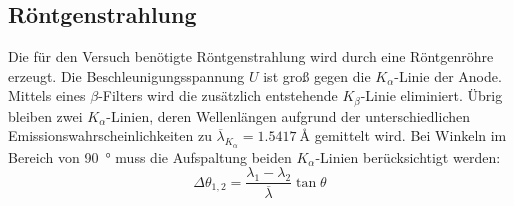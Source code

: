 
\subsection{Röntgenstrahlung}%
\label{sub:roentgenstrahlung}
Die für den Versuch benötigte Röntgenstrahlung wird durch eine Röntgenröhre erzeugt.
Die Beschleunigungsspannung $U$ ist groß gegen die $K_\alpha$-Linie der Anode.
Mittels eines $\beta$-Filters wird die zusätzlich entstehende $K_\beta$-Linie eliminiert.
Übrig bleiben zwei $K_\alpha$-Linien, deren Wellenlängen aufgrund der unterschiedlichen
Emissionswahrscheinlichkeiten zu $\overline{\lambda}_{K_\alpha} = \SI{1.5417}{\angstrom}$
gemittelt wird.
Bei Winkeln im Bereich von \SI{90}{\degree} muss die Aufspaltung beiden $K_\alpha$-Linien
berücksichtigt werden:
\begin{equation}
  \Delta \theta_{1, 2} = \frac{\lambda_1 - \lambda_2}{\overline{\lambda}} \tan{\theta}
  \label{eq:lamtheta}
\end{equation}

